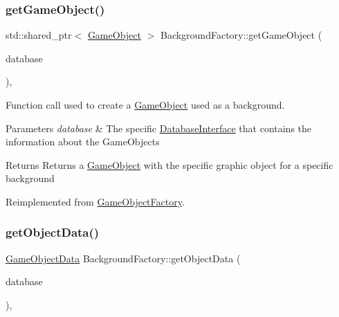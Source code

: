 \subsubsection{\texorpdfstring{get\+Game\+Object()}{getGameObject()}}
{\footnotesize\ttfamily std\+::shared\+\_\+ptr$<$ \hyperlink{class_game_object}{Game\+Object} $>$ Background\+Factory\+::get\+Game\+Object (\begin{DoxyParamCaption}\item[{const std\+::shared\+\_\+ptr$<$ \hyperlink{class_database_interface}{Database\+Interface} $>$ \&}]{database }\end{DoxyParamCaption})\hspace{0.3cm}{\ttfamily [final]}, {\ttfamily [virtual]}}



Function call used to create a \hyperlink{class_game_object}{Game\+Object} used as a background. 


\begin{DoxyParams}{Parameters}
{\em database} & The specific \hyperlink{class_database_interface}{Database\+Interface} that contains the information about the Game\+Objects \\
\hline
\end{DoxyParams}
\begin{DoxyReturn}{Returns}
Returns a \hyperlink{class_game_object}{Game\+Object} with the specific graphic object for a specific background 
\end{DoxyReturn}


Reimplemented from \hyperlink{class_game_object_factory_a5b684a6e77fb82c041f1721eb07c553d}{Game\+Object\+Factory}.

\mbox{\label{class_background_factory_aed13815bcb56568c4b465b5a531ee053}} 
\subsubsection{\texorpdfstring{get\+Object\+Data()}{getObjectData()}}
{\footnotesize\ttfamily \hyperlink{struct_game_object_data}{Game\+Object\+Data} Background\+Factory\+::get\+Object\+Data (\begin{DoxyParamCaption}\item[{const std\+::shared\+\_\+ptr$<$ \hyperlink{class_database_interface}{Database\+Interface} $>$ \&}]{database }\end{DoxyParamCaption})\hspace{0.3cm}{\ttfamily [final]}, {\ttfamily [virtual]}}



